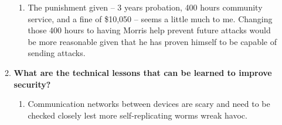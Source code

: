 \documentclass[letterpaper]{article}
\begin{document}
\begin{enumerate}
\begin{enumerate}
\begin{enumerate}
\item The punishment given -- 3 years probation, 400 hours community
service, and a fine of \$10,050 -- seems a little much to me.
Changing those 400 hours to having Morris help prevent future
attacks would be more reasonable given that he has proven himself
to be capable of sending attacks.
\end{enumerate}

\item \textbf{What are the technical lessons that can be learned to improve
security?}

\begin{enumerate}
\item Communication networks between devices are scary and need to be
checked closely lest more self-replicating worms wreak havoc.
\end{enumerate}
\end{enumerate}
\end{enumerate}
\end{document}
